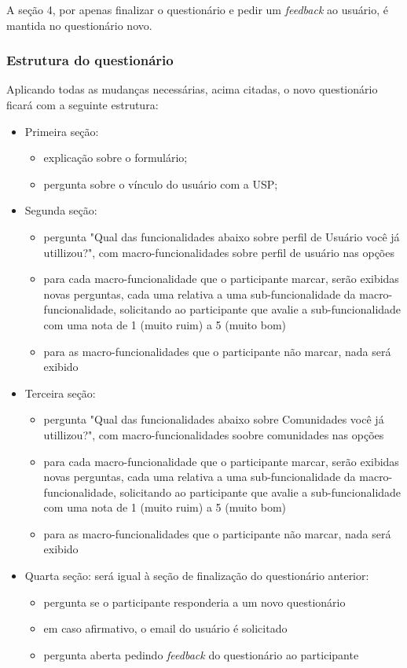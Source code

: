     A seção 4, por apenas finalizar o questionário e pedir um \emph{feedback} ao usuário, é mantida no questionário novo.


\subsubsection{Estrutura do questionário}

    Aplicando todas as mudanças necessárias, acima citadas, o novo questionário ficará com a seguinte estrutura:

\begin{itemize}
\item {
    Primeira seção:
    \begin{itemize}
    \item  explicação sobre o formulário;
    \item  pergunta sobre o vínculo do usuário com a USP;
    \end{itemize}
}
\item {
    Segunda seção:
    \begin{itemize}
    \item pergunta "Qual das funcionalidades abaixo sobre perfil de Usuário você já utillizou?", com macro-funcionalidades sobre perfil de usuário nas opções
    \item para cada macro-funcionalidade que o participante marcar, serão exibidas novas perguntas, cada uma relativa a uma sub-funcionalidade da macro-funcionalidade, solicitando ao participante que avalie a sub-funcionalidade com uma nota de 1 (muito ruim) a 5 (muito bom)
    \item para as macro-funcionalidades que o participante não marcar, nada será exibido
    \end{itemize}
}
\item {
    Terceira seção:
    \begin{itemize}
    \item pergunta "Qual das funcionalidades abaixo sobre Comunidades você já utillizou?", com macro-funcionalidades soobre comunidades nas opções
    \item para cada macro-funcionalidade que o participante marcar, serão exibidas novas perguntas, cada uma relativa a uma sub-funcionalidade da macro-funcionalidade, solicitando ao participante que avalie a sub-funcionalidade com uma nota de 1 (muito ruim) a 5 (muito bom)
    \item para as macro-funcionalidades que o participante não marcar, nada será exibido
    \end{itemize}
}
\item {
    Quarta seção: será igual à seção de finalização do questionário anterior:
    \begin{itemize}
    \item pergunta se o participante responderia a um novo questionário
    \item em caso afirmativo, o email do usuário é solicitado
    \item pergunta aberta pedindo \emph{feedback} do questionário ao participante
    \end{itemize}
}
\end{itemize}

